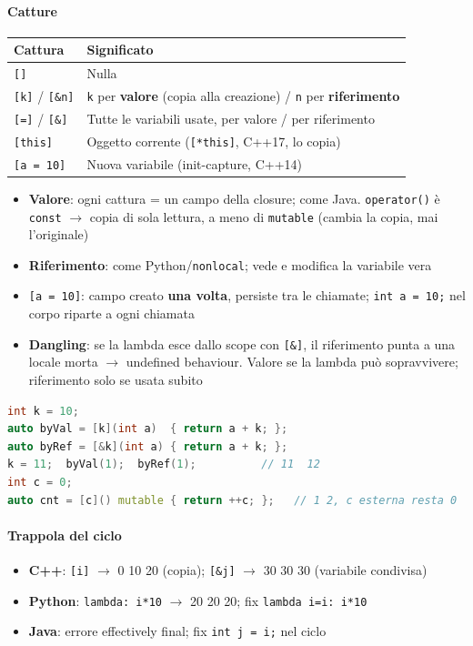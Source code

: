 \documentclass[12pt]{extarticle}
\begin{document}
\paragraph{Catture}
\begin{center}
\small
\begin{tabular}{p{3.0cm}p{11.4cm}}
    \toprule
    \textbf{Cattura} & \textbf{Significato} \\
    \midrule
    \texttt{[]} & Nulla \\
    \addlinespace
    \texttt{[k]} / \texttt{[\&n]} & \texttt{k} per \textbf{valore} (copia alla creazione) / \texttt{n} per \textbf{riferimento} \\
    \addlinespace
    \texttt{[=]} / \texttt{[\&]} & Tutte le variabili usate, per valore / per riferimento \\
    \addlinespace
    \texttt{[this]} & Oggetto corrente (\texttt{[*this]}, C++17, lo copia) \\
    \addlinespace
    \texttt{[a = 10]} & Nuova variabile (init-capture, C++14) \\
    \bottomrule
\end{tabular}
\end{center}
\begin{itemize}
    \item \textbf{Valore}: ogni cattura = un campo della closure; come Java. \texttt{operator()} è \texttt{const} $\rightarrow$ copia di sola lettura, a meno di \texttt{mutable} (cambia la copia, mai l'originale)
    \item \textbf{Riferimento}: come Python/\texttt{nonlocal}; vede e modifica la variabile vera
    \item \texttt{[a = 10]}: campo creato \textbf{una volta}, persiste tra le chiamate; \texttt{int a = 10;} nel corpo riparte a ogni chiamata
    \item \textbf{Dangling}: se la lambda esce dallo scope con \texttt{[\&]}, il riferimento punta a una locale morta $\rightarrow$ undefined behaviour. Valore se la lambda può sopravvivere; riferimento solo se usata subito
\end{itemize}
\begin{lstlisting}[language=C++]
int k = 10;
auto byVal = [k](int a)  { return a + k; };
auto byRef = [&k](int a) { return a + k; };
k = 11;  byVal(1);  byRef(1);          // 11  12
int c = 0;
auto cnt = [c]() mutable { return ++c; };   // 1 2, c esterna resta 0
\end{lstlisting}

\paragraph{Trappola del ciclo}
\begin{itemize}
    \item \textbf{C++}: \texttt{[i]} $\rightarrow$ 0 10 20 (copia); \texttt{[\&j]} $\rightarrow$ 30 30 30 (variabile condivisa)
    \item \textbf{Python}: \texttt{lambda: i*10} $\rightarrow$ 20 20 20; fix \texttt{lambda i=i: i*10}
    \item \textbf{Java}: errore effectively final; fix \texttt{int j = i;} nel ciclo
\end{itemize}
\end{document}
